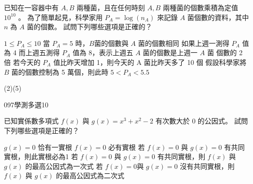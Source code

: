 \begin{QUESTIONS}
\begin{QUESTION}
        \begin{ExamAnsRateInfo}{33}{65}{24}{10}
        \end{ExamAnsRateInfo}
        \begin{QBODY}
			已知在一容器中有 $A,B$ 兩種菌，且在任何時刻 $A,B$ 兩種菌的個數乘積為定值 $10^{10}$ 。
            為了簡單起見，科學家用 $P_A =\log (n_A)$ 來記錄 $A$ 菌個數的資料，其中 $n$  為 $A$ 菌的個數。
            試問下列哪些選項是正確的？
			\begin{QOPS}
				\QOP $1 \leq P_A \leq 10$
				\QOP 當 $P_A =5$ 時，$B$菌的個數與 $A$ 菌的個數相同 
				\QOP 如果上週一測得 $P_A$ 值為 4 而上週五測得 $P_A$ 值為 8，表示上週五 $A$ 菌的個數是上週一 $A$ 菌
			個數的 2 倍 
				\QOP 若今天的 $P_A$ 值比昨天增加 1，則今天的 A 菌比昨天多了 10 個 
				\QOP 假設科學家將 $B$ 菌的個數控制為 5 萬個，則此時 $5<P_A <5.5$
			\end{QOPS}
        \end{QBODY}
        \begin{QFROMS}
        \end{QFROMS}
        \begin{QTAGS}\end{QTAGS}
        \begin{QANS}
            (2)(5)
        \end{QANS}
        \begin{QSOLLIST}
        \end{QSOLLIST}
        \begin{QEMPTYSPACE}
        \end{QEMPTYSPACE}
    \end{QUESTION}
    \begin{QUESTION}
        \begin{ExamInfo}{097}{學測}{多選}{10}
        \end{ExamInfo}
        \begin{ExamAnsRateInfo}{26}{52}{16}{10}
        \end{ExamAnsRateInfo}
        \begin{QBODY}
			已知實係數多項式 $f(x)$ 與 $g(x) = x^3 + x^2 - 2$ 有次數大於 $0$ 的公因式。
			試問下列哪些選項是正確的？
			\begin{QOPS}
				\QOP $g(x)=0$ 恰有一實根 
				\QOP $f(x)=0$ 必有實根 
				\QOP 若 $f(x)=0$ 與 $g(x)=0$ 有共同實根，則此實根必為1 
				\QOP 若 $f(x)=0$ 與 $g(x)=0$ 有共同實根，則 $f(x)$ 與 $g(x)$ 的最高公因式為一次式 
				\QOP 若 $f(x)=0$與 $g(x)=0$ 沒有共同實根，則 $f(x)$ 與 $g(x)$ 的最高公因式為二次式
			\end{QOPS}

\end{QBODY}
\end{QUESTION}
\end{QUESTIONS}
